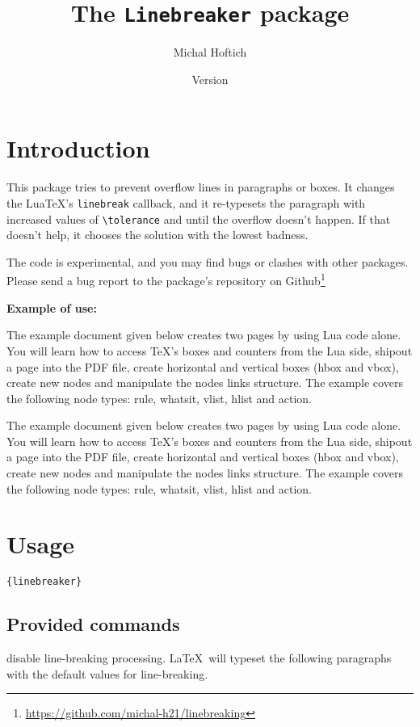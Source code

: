 \documentclass{l3doc}
\title{The \texttt{Linebreaker} package}
\author{Michal Hoftich\authormail{michal.h21@gmail.com}}
\date{Version \version\\\gitdate}
\newcommand\testbox[1]{%
  \parbox{150pt}{%
    \parindent=15pt%
    \tolerance=1%
    \pretolerance=1%
    #1
  }%
}
\newcommand\printtest[1]{%
  \linebreakerdisable%
  \noindent\testbox{%
    #1
  }%
  \linebreakerenable%
  \hfill%
  \testbox{%
    #1
  }%
}
\begin{document}
\maketitle
\tableofcontents

\section{Introduction}

This package tries to prevent overflow lines in paragraphs or boxes.
It changes the Lua\TeX's \verb|linebreak| callback, and it re-typesets the paragraph 
with increased values of \verb|\tolerance| and \cmd{\emergencystretch}
until the overflow doesn't happen. If that doesn't help, it chooses the solution
with the lowest badness.

The code is experimental, and you may find bugs or clashes with
other packages. Please send a bug report to the package's repository on 
Github\footnote{\url{https://github.com/michal-h21/linebreaking}}


\bigskip
\noindent\textbf{Example of use:}
\bigskip

 \def\testtext{%
The example document given below creates two pages by using Lua code alone. You
will learn how to access TeX's boxes and counters from the Lua side, shipout a
page into the PDF file, create horizontal and vertical boxes (hbox and vbox),
create new nodes and manipulate the nodes links structure. The example covers
the following node types: rule, whatsit, vlist, hlist and action.
 }



\printtest\testtext%

\section{Usage}

\cmd{\usepackage}\verb|{linebreaker}|

\subsection{Provided commands}

\begin{function}{\linebreakerdisable}
disable line-breaking processing. \LaTeX\ will typeset the following paragraphs with the default values for line-breaking.
\end{function}
\end{document}
